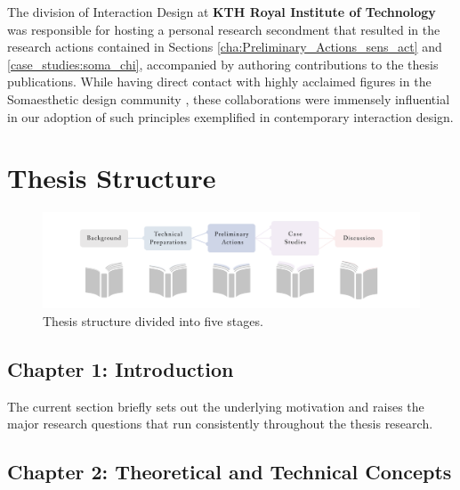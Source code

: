         The division of Interaction Design at \textbf{KTH Royal Institute of Technology} was responsible for hosting a personal research secondment that resulted in the research actions contained in Sections \ref{cha:Preliminary_Actions_sens_act} and \ref{case_studies:soma_chi}, accompanied by authoring contributions to the thesis publications. While having direct contact with highly acclaimed figures in the Somaesthetic design community \cite{hook_designing_2018}, these collaborations were immensely influential in our adoption of such principles exemplified in contemporary interaction design.

\section{Thesis Structure}
\label{sec:structure}

\begin{figure}[htbp]
	\centering
	\includegraphics[width=1.0\textwidth]{Chapters/Figures/background/Sec1_Thesis_Structure}
	\caption{Thesis structure divided into five stages.}
	\label{fig:thesis_structure}
\vspace*{-20pt}
\end{figure}

\subsection*{Chapter 1: Introduction}
The current section briefly sets out the underlying motivation and raises the major research questions that run consistently throughout the thesis research.

\subsection*{Chapter 2: Theoretical and Technical Concepts}

